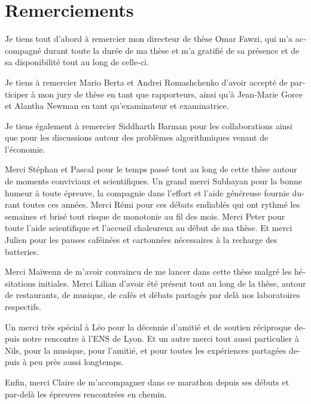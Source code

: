 \thispagestyle{empty}
\chapter*{Remerciements}

\begin{otherlanguage}{french}
  Je tiens tout d'abord à remercier mon directeur de thèse Omar Fawzi, qui m'a accompagné durant toute la durée de ma thèse et m'a gratifié de sa présence et de sa disponibilité tout au long de celle-ci.

  Je tiens à remercier Mario Berta et Andrei Romashchenko d'avoir accepté de participer à mon jury de thèse en tant que rapporteurs, ainsi qu'à Jean-Marie Gorce et Alantha Newman en tant qu'examinateur et examinatrice.

  Je tiens également à remercier Siddharth Barman pour les collaborations ainsi que pour les discussions autour des problèmes algorithmiques venant de l'économie.

  Merci Stéphan et Pascal pour le temps passé tout au long de cette thèse autour de moments conviviaux et scientifiques. Un grand merci Subhayan pour la bonne humeur à toute épreuve, la compagnie dans l'effort et l'aide généreuse fournie durant toutes ces années. Merci Rémi pour ces débats endiablés qui ont rythmé les semaines et brisé tout risque de monotonie au fil des mois. Merci Peter pour toute l'aide scientifique et l'accueil chaleureux au début de ma thèse. Et merci Julien pour les pauses caféinées et cartonnées nécessaires à la recharge des batteries.

  Merci Maïwenn de m'avoir convaincu de me lancer dans cette thèse malgré les hésitations initiales. Merci Lilian d'avoir été présent tout au long de la thèse, autour de restaurants, de musique, de cafés et débats partagés par delà nos laboratoires respectifs.

  Un merci très spécial à Léo pour la décennie d'amitié et de soutien réciproque depuis notre rencontre à l'ENS de Lyon. Et un autre merci tout aussi particulier à Nils, pour la musique, pour l'amitié, et pour toutes les expériences partagées depuis à peu près aussi longtemps.

  Enfin, merci Claire de m'accompagner dans ce marathon depuis ses débuts et par-delà les épreuves rencontrées en chemin.
\end{otherlanguage}
 

